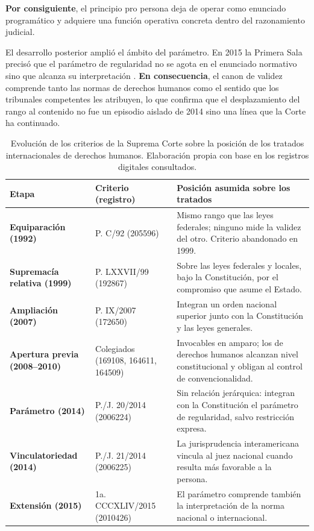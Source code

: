 \documentclass[
  spanish,
  letterpaper, oneside
]{article}
\begin{document}
\textbf{Por consiguiente}, el principio pro persona deja de operar como enunciado programático y adquiere una función operativa concreta dentro del razonamiento judicial.

El desarrollo posterior amplió el ámbito del parámetro. En 2015 la Primera Sala precisó que el parámetro de regularidad no se agota en el enunciado normativo sino que alcanza su interpretación \citep[tesis 1a. CCCXLIV/2015]{scjnTesis2010426}. \textbf{En consecuencia}, el canon de validez comprende tanto las normas de derechos humanos como el sentido que los tribunales competentes les atribuyen, lo que confirma que el desplazamiento del rango al contenido no fue un episodio aislado de 2014 sino una línea que la Corte ha continuado.

\begin{table}[htbp]
  \centering
  \footnotesize
  \renewcommand{\arraystretch}{1.15}
  \begin{tabular}{>{\bfseries}p{}p{}p{}}
    \toprule
    Etapa & Criterio (registro) & Posición asumida sobre los tratados \\
    \midrule
    Equiparación (1992) & P. C/92 (205596) & Mismo rango que las leyes federales; ninguno mide la validez del otro. Criterio abandonado en 1999. \\
    Supremacía relativa (1999) & P. LXXVII/99 (192867) & Sobre las leyes federales y locales, bajo la Constitución, por el compromiso que asume el Estado. \\
    Ampliación (2007) & P. IX/2007 (172650) & Integran un orden nacional superior junto con la Constitución y las leyes generales. \\
    Apertura previa (2008--2010) & Colegiados (169108, 164611, 164509) & Invocables en amparo; los de derechos humanos alcanzan nivel constitucional y obligan al control de convencionalidad. \\
    Parámetro (2014) & P./J. 20/2014 (2006224) & Sin relación jerárquica: integran con la Constitución el parámetro de regularidad, salvo restricción expresa. \\
    Vinculatoriedad (2014) & P./J. 21/2014 (2006225) & La jurisprudencia interamericana vincula al juez nacional cuando resulta más favorable a la persona. \\
    Extensión (2015) & 1a. CCCXLIV/2015 (2010426) & El parámetro comprende también la interpretación de la norma nacional o internacional. \\
    \bottomrule
  \end{tabular}
  \caption{Evolución de los criterios de la Suprema Corte sobre la posición de los tratados internacionales de derechos humanos. Elaboración propia con base en los registros digitales consultados.}
\end{table}
\end{document}
